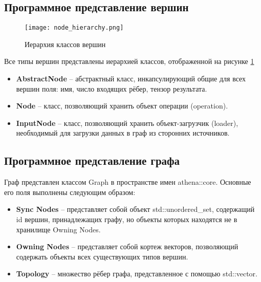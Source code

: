 \subsection{Программное представление вершин}
\label{sec:softwarepresentationnodes}
\begin{figure}[ht]
    \centering
    \texttt{[image: node\_hierarchy.png]}
    \caption{Иерархия классов вершин}
    \label{fig:nodes_hierarchy}
\end{figure}
Все типы вершин представлены иерархией классов, отображенной на рисунке \ref{fig:nodes_hierarchy}
\begin{itemize}
    \item \textbf{AbstractNode} -- абстрактный класс, инкапсулирующий общие для всех вершин поля: имя, число входящих рёбер, тензор результата.
    \item \textbf{Node} -- класс, позволяющий хранить объект операции (operation).
    \item \textbf{InputNode} -- класс, позволяющий хранить объект-загрузчик (loader), необходимый для загрузки данных в граф из сторонних источников.
\end{itemize}
\subsection{Программное представление графа}
\label{sec:softwarepresentationgraph}
Граф представлен классом Graph в пространстве имен athena::core. Основные его поля выполнены следующим образом:
\begin{itemize}
    \item \textbf{Sync Nodes} -- представляет собой объект std::unordered\_set, содержащий id вершин, принадлежащих графу, но объекты которых находятся не в хранилище Owning Nodes.
    \item \textbf{Owning Nodes} -- представляет собой кортеж векторов, позволяющий содержать объекты всех существующих типов вершин.
    \item \textbf{Topology} -- множество рёбер графа, представленное с помощью std::vector.
\end{itemize}
